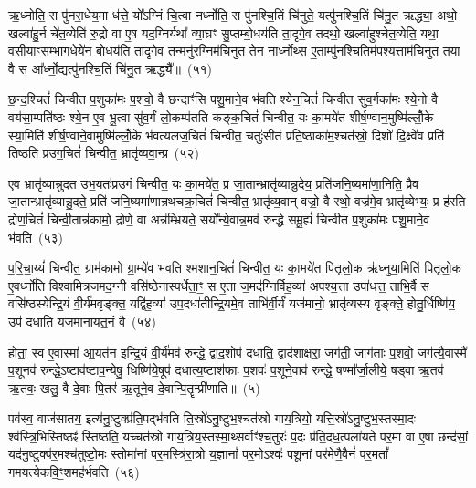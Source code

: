ऋ॒ध्नोति॒ स पु॑नरा॒धेय॒मा ध॑त्ते॒ यो᳚\-ऽग्निं चि॒त्वा नर्ध्नोति॒ स पु॑नश्चि॒तिं चि॑नुते॒ यत्पु॑नश्चि॒तिं चि॑नु॒त ऋद्ध्या॒ अथो॒ खल्वा॑हु॒र्न चे॑त॒व्येति॑ रु॒द्रो वा ए॒ष यद॒ग्निर्यथा᳚ व्या॒घ्रꣳ सु॒प्तम्बो॒धय॑ति ता॒दृगे॒व तदथो॒ खल्वा॑हुश्चेत॒व्येति॒ यथा॒ वसी॑याꣳसम्भाग॒धेये॑न बो॒धय॑ति ता॒दृगे॒व तन्मनु॑र॒ग्निम॑चिनुत॒ तेन॒ नार्ध्नो॒थ्स ए॒ताम्पु॑नश्चि॒तिम॑पश्य॒त्ताम॑चिनुत॒ तया॒ वै स आ᳚र्ध्नो॒द्यत्पु॑नश्चि॒तिं चि॑नु॒त ऋद्ध्यै᳚॥~(५१)

{\anuvakamend[{त्रि॒वृदथ॒ तिष्ठ॑न्त्यग्न्या॒धेये॑न॒ नाचि॑नुत स॒प्तद॑श च}]}%

छ॒न्द॒श्चितं॑ चिन्वीत प॒शुका॑मः प॒शवो॒ वै छन्दाꣳ॑सि पशु॒माने॒व भ॑वति श्येन॒चितं॑ चिन्वीत सुव॒र्गका॑मः श्ये॒नो वै वय॑सा॒म्पति॑ष्ठः श्ये॒न ए॒व भू॒त्वा सु॑व॒र्गं लो॒कम्प॑तति कङ्क॒चितं॑ चिन्वीत॒ यः का॒मये॑त शीर्\mbox{}ष॒ण्वान॒मुष्मि॑ल्लोँ॒के स्या॒मिति॑ शीर्\mbox{}ष॒ण्वाने॒वामुष्मि॑ल्लोँ॒के भ॑वत्यलज॒चितं॑ चिन्वीत॒ चतुः॑सीतं प्रति॒ष्ठाका॑म॒श्चत॑स्रो॒ दिशो॑ दि॒क्ष्वे॑व प्रति॑ तिष्ठति प्रउग॒चितं॑ चिन्वीत॒ भ्रातृ॑व्यवा॒न्प्र~(५२)

ए॒व भ्रातृ॑व्यान्नुदत उभ॒यतः॑प्रउगं चिन्वीत॒ यः का॒मये॑त॒ प्र जा॒तान्भ्रातृ॑व्यान्नु॒देय॒ प्रति॑जनि॒ष्यमा॑णा॒निति॒ प्रैव जा॒तान्भ्रातृ॑व्यान्नु॒दते॒ प्रति॑ जनि॒ष्यमा॑णान्रथचक्र॒चितं॑ चिन्वीत॒ भ्रातृ॑व्य॒वान् वज्रो॒ वै रथो॒ वज्र॑मे॒व भ्रातृ॑व्येभ्यः॒ प्र ह॑रति द्रोण॒चितं॑ चिन्वी॒तान्न॑कामो॒ द्रोणे॒ वा अन्न॑म्भ्रियते॒ सयो᳚न्ये॒वान्न॒मव॑ रुन्द्धे समू॒ह्यं॑ चिन्वीत प॒शुका॑मः पशु॒माने॒व भ॑वति~(५३)

प॒रि॒चा॒य्यं॑ चिन्वीत॒ ग्राम॑कामो ग्रा॒म्ये॑व भ॑वति श्मशान॒चितं॑ चिन्वीत॒ यः का॒मये॑त पितृलो॒क ऋ॑ध्नुया॒मिति॑ पितृलो॒क ए॒वर्ध्नो॑ति विश्वामित्रजमद॒ग्नी वसि॑ष्ठेनास्पर्धेता॒ꣳ॒ स ए॒ता ज॒मद॑ग्निर्विह॒व्या॑ अपश्य॒त्ता उपा॑धत्त॒ ताभि॒र्वै स वसि॑ष्ठस्येन्द्रि॒यं वी॒र्य॑मवृङ्क्त॒ यद्वि॑ह॒व्या॑ उप॒दधा॑तीन्द्रि॒यमे॒व ताभि॑र्वी॒र्यं॑ यज॑मानो॒ भ्रातृ॑व्यस्य वृङ्क्ते॒ होतु॒र्धिष्णि॑य॒ उप॑ दधाति यजमानायत॒नं वै~(५४)

होता॒ स्व ए॒वास्मा॑ आ॒यत॑न इन्द्रि॒यं वी॒र्य॑मव॑ रुन्द्धे॒ द्वाद॒शोप॑ दधाति॒ द्वाद॑शाक्षरा॒ जग॑ती॒ जाग॑ताः प॒शवो॒ जग॑त्यै॒वास्मै॑ प॒शूनव॑ रुन्द्धे॒\-ऽष्टाव॑ष्टाव॒न्येषु॒ धिष्णि॑ये॒षूप॑ दधात्य॒ष्टाश॑फाः प॒शवः॑ प॒शूने॒वाव॑ रुन्द्धे॒ षण्मा᳚र्जा॒लीये॒ षड्वा ऋ॒तव॑ ऋ॒तवः॒ खलु॒ वै दे॒वाः पि॒तर॑ ऋ॒तूने॒व दे॒वान्पि॒तॄन्प्री॑णाति॥~(५)

{}%

पव॑स्व॒ वाज॑सातय॒ इत्य॑नु॒ष्टुक्प्र॑ति॒पद्भ॑वति ति॒स्रो॑\-ऽनु॒ष्टुभ॒श्चत॑स्रो गाय॒त्रियो॒ यत्ति॒स्रो॑\-ऽनु॒ष्टुभ॒स्तस्मा॒दः श्व॑स्त्रि॒भिस्तिष्ठꣴ॑ स्तिष्ठति॒ यच्चत॑स्रो गाय॒त्रिय॒स्तस्मा॒थ्सर्वाꣳ॑श्च॒तुरः॑ प॒दः प्र॑ति॒दध॒त्पला॑यते पर॒मा वा ए॒षा छन्द॑सां॒ यद॑नु॒ष्टुक्प॑र॒मश्च॑तुष्टो॒मः स्तोमा॑नां पर॒मस्त्रि॑रा॒त्रो य॒ज्ञानां᳚ पर॒मो\-ऽश्वः॑ पशू॒नां पर॑मेणै॒वैनं॑ पर॒मतां᳚ गमयत्येकवि॒ꣳ॒शमह॑र्भवति~(५६)

